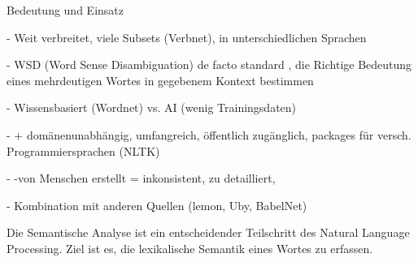 Bedeutung und Einsatz

-	Weit verbreitet, viele Subsets (Verbnet), in unterschiedlichen Sprachen

-	WSD (Word Sense Disambiguation) de facto standard , die Richtige Bedeutung eines mehrdeutigen Wortes in gegebenem Kontext bestimmen

-	Wissensbasiert (Wordnet) vs. AI (wenig Trainingsdaten)

-	+ domänenunabhängig, umfangreich, öffentlich zugänglich, packages für versch. Programmiersprachen (NLTK)

-	-von Menschen erstellt = inkonsistent, zu detailliert,
 
-	Kombination mit anderen Quellen (lemon, Uby, BabelNet)


Die Semantische Analyse ist ein entscheidender Teilschritt des Natural Language Processing. Ziel ist es, die lexikalische Semantik eines Wortes zu erfassen.
